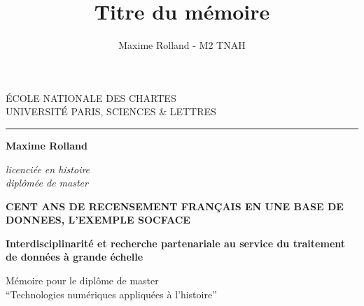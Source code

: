 \documentclass[a4paper,12pt,twoside]{book}
\author{Maxime Rolland - M2 TNAH}
\title{Titre du mémoire}
\begin{document}
	\begin{titlepage}
		\begin{center}
			
			\bigskip
			
			\begin{large}				
				ÉCOLE NATIONALE DES CHARTES\\
				UNIVERSITÉ PARIS, SCIENCES \& LETTRES
			\end{large}
			\begin{center}\rule{2cm}{0.02cm}\end{center}
			
			\bigskip
			\bigskip
			\bigskip
			\begin{Large}
				\textbf{Maxime Rolland}\\
			\end{Large}
			\begin{normalsize} \textit{licenciée en histoire}\\
				\textit{diplômée de master}
			\end{normalsize}
			
			\bigskip
			\bigskip
			\bigskip
			
			\begin{Huge}
				\textbf\textbf{CENT ANS DE RECENSEMENT FRANÇAIS EN UNE BASE DE DONNEES, L’EXEMPLE SOCFACE}\\
			\end{Huge}
			\bigskip
			\bigskip
			\begin{LARGE}
				\textbf{Interdisciplinarité et recherche partenariale au service du traitement de données à grande échelle}\\
			\end{LARGE}
			
			\bigskip
			\bigskip
			\bigskip
			\begin{large}
			\end{large}
			\vfill
			
			\begin{large}
				Mémoire 
				pour le diplôme de master \\
				\enquote{Technologies numériques appliquées à l'histoire} \\
			\end{large}
			
		\end{center}
	\end{titlepage}

	\thispagestyle{empty}	
	\cleardoublepage
	
\frontmatter
\end{document}
